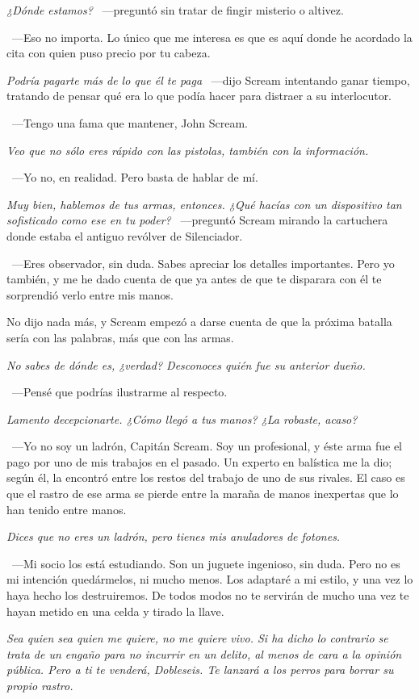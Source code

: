 \emph{¿Dónde estamos?} ~---preguntó sin tratar de fingir misterio o altivez.

~---Eso no importa. Lo único que me interesa es que es aquí donde he acordado la cita con quien puso precio por tu cabeza.

\emph{Podría pagarte más de lo que él te paga} ~---dijo Scream intentando ganar tiempo, tratando de pensar qué era lo que podía hacer para distraer a su interlocutor.

~---Tengo una fama que mantener, John Scream.

\emph{Veo que no sólo eres rápido con las pistolas, también con la información.}

~---Yo no, en realidad. Pero basta de hablar de mí.

\emph{Muy bien, hablemos de tus armas, entonces. ¿Qué hacías con un dispositivo tan sofisticado como ese en tu poder?} ~---preguntó Scream mirando la cartuchera donde estaba el antiguo revólver de Silenciador.

~---Eres observador, sin duda. Sabes apreciar los detalles importantes. Pero yo también, y me he dado cuenta de que ya antes de que te disparara con él te sorprendió verlo entre mis manos.

No dijo nada más, y Scream empezó a darse cuenta de que la próxima batalla sería con las palabras, más que con las armas.

\emph{No sabes de dónde es, ¿verdad? Desconoces quién fue su anterior dueño.}

~---Pensé que podrías ilustrarme al respecto.

\emph{Lamento decepcionarte. ¿Cómo llegó a tus manos? ¿La robaste, acaso?}

~---Yo no soy un ladrón, Capitán Scream. Soy un profesional, y éste arma fue el pago por uno de mis trabajos en el pasado. Un experto en balística me la dio; según él, la encontró entre los restos del trabajo de uno de sus rivales. El caso es que el rastro de ese arma se pierde entre la maraña de manos inexpertas que lo han tenido entre manos.

\emph{Dices que no eres un ladrón, pero tienes mis anuladores de fotones.}

~---Mi socio los está estudiando. Son un juguete ingenioso, sin duda. Pero no es mi intención quedármelos, ni mucho menos. Los adaptaré a mi estilo, y una vez lo haya hecho los destruiremos. De todos modos no te servirán de mucho una vez te hayan metido en una celda y tirado la llave.

\emph{Sea quien sea quien me quiere, no me quiere vivo. Si ha dicho lo contrario se trata de un engaño para no incurrir en un delito, al menos de cara a la opinión pública. Pero a ti te venderá, Dobleseis. Te lanzará a los perros para borrar su propio rastro.}

